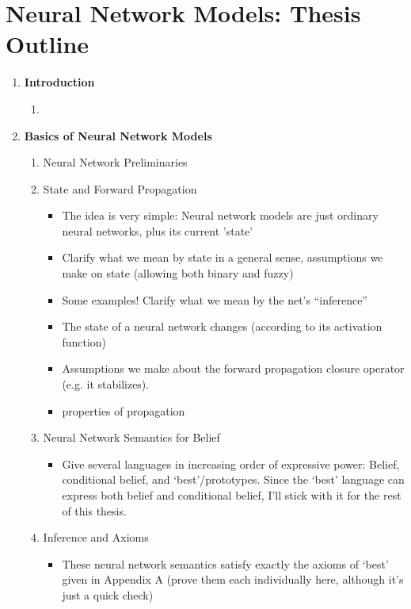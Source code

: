 \documentclass[letterpaper]{article}
\begin{document}
\section*{Neural Network Models: Thesis Outline}

\begin{enumerate}
    \item \textbf{Introduction}
    \begin{enumerate}
        \item 
    \end{enumerate}

    \item \textbf{Basics of Neural Network Models}
    \begin{enumerate}
        \item Neural Network Preliminaries

        \item State and Forward Propagation
        \begin{itemize}
            \item The idea is very simple: Neural network models are just ordinary neural networks, plus its current 'state'
            \item Clarify what we mean by state in a general sense, assumptions we make on state (allowing both binary and fuzzy)
            \item Some examples!  Clarify what we mean by the net's ``inference''
            \item The state of a neural network changes (according to its activation function)
            \item Assumptions we make about the forward propagation closure operator (e.g. it stabilizes).
            \item properties of propagation
        \end{itemize}

        \item Neural Network Semantics for Belief
        \begin{itemize}
            \item Give several languages in increasing order of expressive power: Belief, conditional belief, and `best'/prototypes.  Since the `best' language can express both belief and conditional belief, I'll stick with it for the rest of this thesis.
        \end{itemize}

        \item Inference and Axioms
        \begin{itemize}
            \item These neural network semantics satisfy exactly the axioms of `best' given in Appendix A (prove them each individually here, although it's just a quick check)
        \end{itemize}
        

\end{enumerate}
\end{enumerate}
\end{document}
